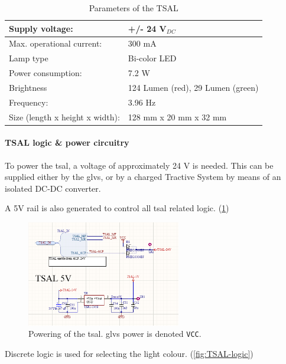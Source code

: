 \begin{table}[H]
	\centering
	\caption{Parameters of the TSAL}
	\begin{tabularx}{\textwidth}{|X|X|}
		\hline
		Supply voltage: & +/- 24 V$_{DC}$ \\[\TableSize]
		\hline
		Max. operational current: & 300 mA \\[\TableSize]
		\hline
		Lamp type & Bi-color LED \\[\TableSize]
		\hline
		Power consumption: & 7.2 W \\[\TableSize]
		\hline
		Brightness & 124 Lumen (red), 29 Lumen (green) \\[\TableSize]
		\hline
		Frequency: & 3.96 Hz \\[\TableSize]
		\hline
		Size (length x height x width): & 128 mm x 20 mm x 32 mm \\[\TableSize]
		\hline
	\end{tabularx}%
	\label{tab:TSAL}%
\end{table}%

\paragraph{TSAL logic \& power circuitry}

To power the \gls{tsal}, a voltage of approximately 24 V is needed. This can be supplied either by the \gls{glvs}, or by a charged Tractive System by means of an isolated DC-DC converter.

A 5V rail is also generated to control all \gls{tsal} related logic. (\ref{fig:TSAL-ECUB-5V})

\begin{figure}[H]
	\centering
	\includegraphics[width=0.6\textwidth]{./img/TSAL-ECUB-5V.png}
	\caption[Powering of the TSAL]{Powering of the \gls{tsal}. \gls{glvs} power is denoted \texttt{VCC}.}
	\label{fig:TSAL-ECUB-5V}
\end{figure}

Discrete logic is used for selecting the light colour. (\ref{fig:TSAL-logic})


